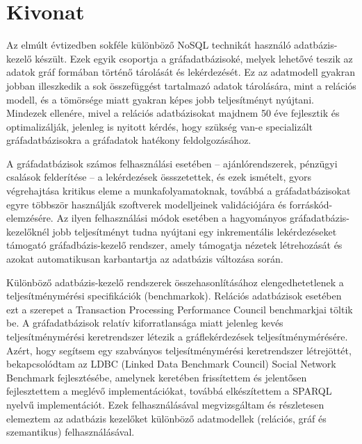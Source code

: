 \setcounter{page}{1}

\selecthungarian

\chapter*{Kivonat}

Az elmúlt évtizedben sokféle különböző NoSQL technikát használó adatbázis-kezelő készült. Ezek egyik csoportja a gráfadatbázisoké, melyek lehetővé teszik az adatok gráf formában történő tárolását és lekérdezését. Ez az adatmodell gyakran jobban illeszkedik a sok összefüggést tartalmazó adatok tárolására, mint a relációs modell, és a tömörsége miatt gyakran képes jobb teljesítményt nyújtani. Mindezek ellenére, mivel a relációs adatbázisokat majdnem 50 éve fejlesztik és optimalizálják, jelenleg is nyitott kérdés, hogy szükség van-e specializált gráfadatbázisokra a gráfadatok hatékony feldolgozásához.

A gráfadatbázisok számos felhasználási esetében -- ajánlórendszerek, pénzügyi csalások felderítése -- a lekérdezések össszetettek, és ezek ismételt, gyors végrehajtása kritikus eleme a munkafolyamatoknak, továbbá a gráfadatbázisokat egyre többször használják szoftverek modelljeinek validációjára és forráskód-elemzésére. Az ilyen felhasználási módok esetében a hagyományos gráfadatbázis-kezelőknél jobb teljesítményt tudna nyújtani egy inkrementális lekérdezéseket támogató gráfadbázis-kezelő rendszer, amely támogatja nézetek létrehozását és azokat automatikusan karbantartja az adatbázis változása során.

Különböző adatbázis-kezelő rendszerek összehasonlításához elengedhetetlenek a teljesítménymérési specifikációk (benchmarkok). Relációs adatbázisok esetében ezt a szerepet a Transaction Processing Performance Council benchmarkjai töltik be. A gráfadatbázisok relatív kiforratlansága miatt jelenleg kevés teljesítménymérési keretrendszer létezik a gráflekérdezések teljesítménymérésére. Azért, hogy segítsem egy szabványos teljesítménymérési keretrendszer létrejöttét, bekapcsolódtam az LDBC (Linked Data Benchmark Council) Social Network Benchmark fejlesztésébe, amelynek keretében frissítettem és jelentősen fejlesztettem a meglévő implementációkat, továbbá elkészítettem a SPARQL nyelvű implementációt. Ezek felhasználásával megvizsgáltam és részletesen elemeztem az adatbázis kezelőket különböző adatmodellek (relációs, gráf és szemantikus) felhasználásával.

